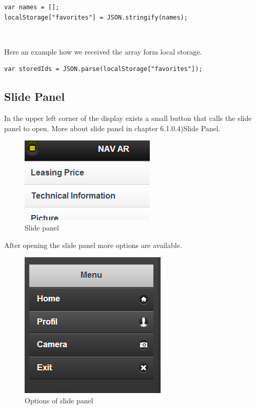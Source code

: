 \begin{lstlisting}[language=html, caption= 
array into local storage,captionpos=b]
var names = [];
localStorage["favorites"] = JSON.stringify(names);
\end{lstlisting}
\
\

Here an example how we received the array form local storage.
\\
\begin{lstlisting}[language=html, caption= 
start timer function,captionpos=b]
var storedIds = JSON.parse(localStorage["favorites"]);
\end{lstlisting}

\newpage


\subsection{Slide Panel}
In the upper left corner of the display exists a small button that calls the slide panel to open. More about slide panel in chapter 6.1.0.4)Slide Panel.
\\

\begin{figure}[h]
\centering
\includegraphics[width=0.5\linewidth]{graphics/chapter4/13}
\caption{Slide panel}
\end{figure}

After opening the slide panel more options are available. 
\\

\begin{figure}[h]
\centering
\includegraphics[width=0.5\linewidth]{graphics/chapter4/14}
\caption{Options of slide panel}
\end{figure}
\newpage

